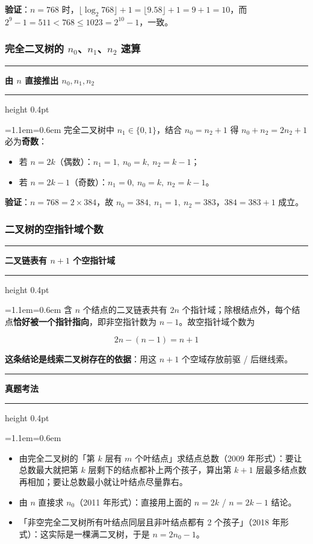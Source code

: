 \documentclass[11pt,openany,UTF8]{ctexbook}
\newcommand{\callouthead}[2]{%
  \par\addvspace{7pt}\noindent
  {\color{#1}\rule[-0.15em]{3pt}{1.05em}}\hspace{0.5em}%
  {\bfseries\color{#1}#2}\par\nobreak\vspace{-0.35em}%
  {\color{rulesep}\hrule height 0.4pt}\nobreak\vspace{0.45em}%
  \begingroup\small\setlength{\parindent}{0pt}%
  \leftskip=1.1em\rightskip=0.6em\noindent\ignorespaces}
\newcommand{\calloutend}{\par\endgroup\addvspace{7pt}}
\newenvironment{callkey}[1]{\callouthead{keybar}{#1}}{\calloutend}
\newenvironment{callexam}[1]{\callouthead{exambar}{#1}}{\calloutend}
\begin{document}
\textbf{验证}：$n=768$ 时，$\lfloor\log_2 768\rfloor+1=\lfloor9.58\rfloor+1=9+1=10$，而 $2^9-1=511<768\le1023=2^{10}-1$，一致。

\subsubsection{完全二叉树的 $n_0$、$n_1$、$n_2$ 速算}

\begin{callkey}{由 $n$ 直接推出 $n_0,n_1,n_2$}
完全二叉树中 $n_1\in\{0,1\}$，结合 $n_0=n_2+1$ 得 $n_0+n_2=2n_2+1$ 必为\textbf{奇数}：

\begin{itemize}
\item 若 $n=2k$（偶数）：$n_1=1,\ n_0=k,\ n_2=k-1$；
\item 若 $n=2k-1$（奇数）：$n_1=0,\ n_0=k,\ n_2=k-1$。
\end{itemize}
\textbf{验证}：$n=768=2\times384$，故 $n_0=384,\ n_1=1,\ n_2=383$，$384=383+1$ 成立。

\end{callkey}

\subsubsection{二叉树的空指针域个数}

\begin{callkey}{二叉链表有 $n+1$ 个空指针域}
含 $n$ 个结点的二叉链表共有 $2n$ 个指针域；除根结点外，每个结点\textbf{恰好被一个指针指向}，即非空指针数为 $n-1$。故空指针域个数为

\[2n-(n-1)=n+1\]

\textbf{这条结论是线索二叉树存在的依据}：用这 $n+1$ 个空域存放前驱 / 后继线索。

\end{callkey}

\begin{callexam}{真题考法}
\begin{itemize}
\item 由完全二叉树的「第 $k$ 层有 $m$ 个叶结点」求结点总数（2009 年形式）：要让总数最大就把第 $k$ 层剩下的结点都补上两个孩子，算出第 $k+1$ 层最多结点数再相加；要让总数最小就让叶结点尽量靠右。
\item 由 $n$ 直接求 $n_0$（2011 年形式）：直接用上面的 $n=2k$ / $n=2k-1$ 结论。
\item 「非空完全二叉树所有叶结点同层且非叶结点都有 2 个孩子」（2018 年形式）：这实际是一棵满二叉树，于是 $n=2n_0-1$。
\end{itemize}
\end{callexam}
\end{document}
